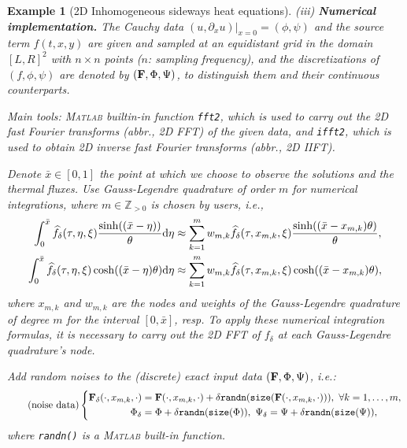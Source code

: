 \documentclass[oneside,11pt]{book}
\numberwithin{equation}{section}
\newtheorem{example}{Example}[section]
\begin{document}
\begin{example}[2D Inhomogeneous sideways heat equations]
    \noindent(iii) \textbf{Numerical implementation.} The Cauchy data $(u,\partial_xu)|_{x=0} = (\phi,\psi)$ and the source term $f(t,x,y)$ are given and sampled at an equidistant grid in the domain $[L,R]^2$ with $n\times n$ points ($n$: sampling frequency), and the discretizations of $(f,\phi,\psi)$ are denoted by $({\bf F},\Phi,\Psi)$, to distinguish them and their continuous counterparts.
    
    Main tools: \textsc{Matlab} builtin-in function \verb|fft2|, which is used to carry out the 2D fast Fourier transforms (abbr., 2D FFT) of the given data, and \verb|ifft2|, which is used to obtain 2D inverse fast Fourier transforms (abbr., 2D IIFT). 
    
    Denote $\bar{x}\in[0,1]$ the point at which we choose to observe the solutions and the thermal fluxes. Use Gauss-Legendre quadrature of order $m$ for numerical integrations, where $m\in\mathbb{Z}_{> 0}$ is chosen by users, i.e.,
    \begin{align*}
        \int_0^{\bar{x}} \widehat{f_\delta}(\tau,\eta,\xi)\frac{\sinh((\bar{x} - \eta))}{\theta}{\rm d}\eta&\approx\sum_{k=1}^m w_{m,k}\widehat{f_\delta}(\tau,x_{m,k},\xi)\frac{\sinh((\bar{x} - x_{m,k})\theta)}{\theta},\\
        \int_0^{\bar{x}} \widehat{f_\delta}(\tau,\eta,\xi)\cosh((\bar{x} - \eta)\theta){\rm d}\eta&\approx\sum_{k=1}^m w_{m,k}\widehat{f_\delta}(\tau,x_{m,k},\xi)\cosh((\bar{x} - x_{m,k})\theta),
    \end{align*}
    where $x_{m,k}$ and $w_{m,k}$ are the nodes and weights of the Gauss-Legendre quadrature of degree $m$ for the interval $[0,\bar{x}]$, resp. To apply these numerical integration formulas, it is necessary to carry out the 2D FFT of $f_\delta$ at each Gauss-Legendre quadrature's node.
    
    Add random noises to the (discrete) exact input data $({\bf F},\Phi,\Psi)$, i.e.:
    \begin{equation}
        \label{noise data}
        \tag{noise data}
        \left\{\begin{split}
            {\bf F}_\delta(\cdot,x_{m,k},\cdot) &= {\bf F}(\cdot,x_{m,k},\cdot) + \delta\texttt{randn}(\texttt{size}({\bf F}(\cdot,x_{m,k},\cdot))),\ \forall k = 1,\ldots,m,\\
            \Phi_\delta &= \Phi + \delta\texttt{randn}(\texttt{size}(\Phi)),\ \Psi_\delta = \Psi + \delta\texttt{randn}(\texttt{size}(\Psi)),
        \end{split}\right.        
    \end{equation}
    where \verb|randn()| is a \textsc{Matlab} built-in function.
    

\end{example}
\end{document}
